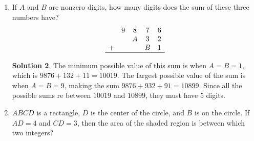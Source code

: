 \documentclass{article}
\theoremstyle{definition}
\newtheorem*{solution}{Solution}
\begin{document}
\begin{multicols*}{2}
\begin{enumerate}
\begin{center}
            \end{center}
            \begin{solution}
                Fold the four squares into four sides of a cube.
                Then, there are six unconnected edges.
                For each open edge, we can add a square/side, so the answer is $6$
            \end{solution}
        \item If $A$ and $B$ are nonzero digits, how many digits does the sum of these three numbers have?
			\[
				\begin{array}{ccccc}
					  & 9 & 8 & 7 & 6 \\
					  &   & A & 3 & 2 \\
					+ &   &   & B & 1 \\
					\hline
				\end{array}
			\]
            \begin{solution}
                The minimum possible value of this sum is when $A = B = 1$, which is $9876 + 132 + 11 = 10019$.
                The largest possible value of the sum is when $A = B = 9$, making the sum $9876 + 932 + 91 = 10899$.
                Since all the possible sums re between $10019$ and $10899$, they must have $5$ digits.
            \end{solution}
        \item $ABCD$ is a rectangle, $D$ is the center of the circle, and $B$ is on the circle.
            If $AD = 4$ and $CD = 3$, then the area of the shaded region is between which two integers?
            \begin{center}
\end{center}
\end{enumerate}
\end{multicols*}
\end{document}
